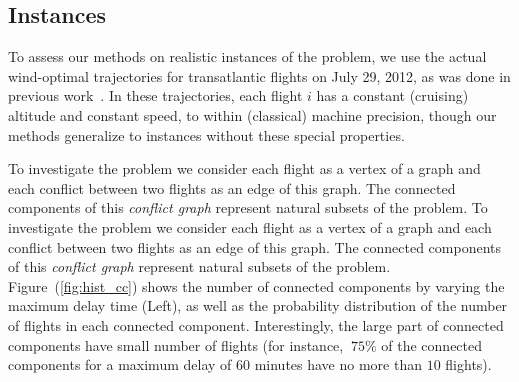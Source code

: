 \subsection{Instances}\label{sec:instances}
To assess our methods on realistic instances of the problem, we use the actual wind-optimal trajectories for transatlantic flights on July 29, 2012, as was done in previous work~\cite{rodionova16}.
In these trajectories, each flight $i$ has a constant (cruising) altitude 
and constant speed, to within (classical) machine precision,
though our methods generalize to instances without these special properties.

To investigate the problem we consider each flight as a vertex of a graph and each conflict between two flights as an edge of this graph.
The connected components of this \emph{conflict graph} represent natural subsets of the problem.
To investigate the problem we consider each flight as a vertex of a graph and
each conflict between two flights as an edge of this graph.  The connected
components of this \emph{conflict graph} represent natural subsets of the
problem. Figure~(\ref{fig:hist_cc}) shows the number of connected components by
varying the maximum delay time (Left), as well as the probability distribution
of the number of flights in each connected component. Interestingly, the large
part of connected components have small number of flights (for instance, $~75\%$
of the connected components for a maximum delay of $60$ minutes have no more
than $10$ flights). 

